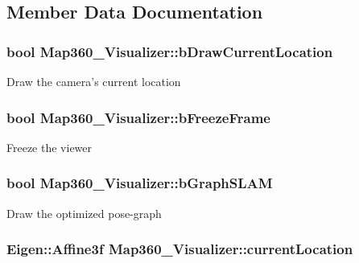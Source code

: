 \subsection{Member Data Documentation}
\hypertarget{classMap360__Visualizer_aaac4aa1c98ee63511c9599625bc6bd54}{
\subsubsection[{b\-Draw\-Current\-Location}]{\setlength{\rightskip}{0pt plus 5cm}bool Map360\-\_\-\-Visualizer\-::b\-Draw\-Current\-Location}}\label{classMap360__Visualizer_aaac4aa1c98ee63511c9599625bc6bd54}
Draw the camera's current location \hypertarget{classMap360__Visualizer_a2794e5ff22d05c4436da0edeb41db95b}{
\subsubsection[{b\-Freeze\-Frame}]{\setlength{\rightskip}{0pt plus 5cm}bool Map360\-\_\-\-Visualizer\-::b\-Freeze\-Frame}}\label{classMap360__Visualizer_a2794e5ff22d05c4436da0edeb41db95b}
Freeze the viewer \hypertarget{classMap360__Visualizer_a1951f5fab820696abf4a8706ee2a2e7f}{
\subsubsection[{b\-Graph\-S\-L\-A\-M}]{\setlength{\rightskip}{0pt plus 5cm}bool Map360\-\_\-\-Visualizer\-::b\-Graph\-S\-L\-A\-M}}\label{classMap360__Visualizer_a1951f5fab820696abf4a8706ee2a2e7f}
Draw the optimized pose-\/graph \hypertarget{classMap360__Visualizer_a53d4d24b998db0f3437227fb308ef77d}{
\subsubsection[{current\-Location}]{\setlength{\rightskip}{0pt plus 5cm}Eigen\-::\-Affine3f Map360\-\_\-\-Visualizer\-::current\-Location}}\label{classMap360__Visualizer_a53d4d24b998db0f3437227fb308ef77d}
